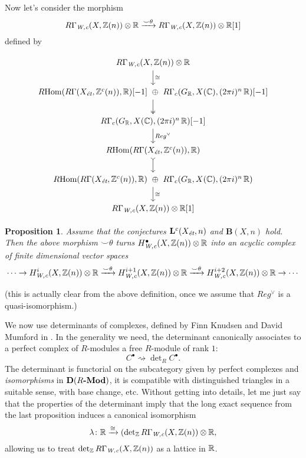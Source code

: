 \documentclass{article}
\theoremstyle{plain}
\newtheorem*{proposition*}{Proposition}
\begin{document}
\pagebreak

Now let's consider the morphism
\[ R\Gamma_\text{\it W,c} (X, \mathbb{Z}(n)) \otimes \mathbb{R}
  \xrightarrow{\smile\theta}
  R\Gamma_\text{\it W,c} (X, \mathbb{Z}(n)) \otimes \mathbb{R} [1] \]
defined by

\[ \begin{tikzcd}
    R\Gamma_\text{\it W,c} (X, \ZZ (n)) \otimes \RR \ar{d}{\isom} \\
    \RHom (R\Gamma (X_\text{\it ét}, \ZZ^c (n)), \RR) [-1] ~\oplus~ R\Gamma_c (G_\RR, X (\CC), (2\pi i)^n\,\RR) [-1] \ar[twoheadrightarrow]{d} \\
    R\Gamma_c (G_\RR, X (\CC), (2\pi i)^n\,\RR) [-1] \ar{d}{Reg^\vee}\\
    \RHom (R\Gamma (X_\text{\it ét}, \ZZ^c (n)), \RR) \ar[rightarrowtail]{d} \\
    \RHom (R\Gamma (X_\text{\it ét}, \ZZ^c (n)), \RR) ~\oplus~ R\Gamma_c (G_\RR, X (\CC), (2\pi i)^n\,\RR) \ar{d}{\isom} \\
    R\Gamma_\text{\it W,c} (X, \ZZ (n)) \otimes \RR [1]
  \end{tikzcd} \]

\begin{proposition*}
  Assume that the conjectures $\mathbf{L}^c (X_\text{\it ét},n)$ and
  $\mathbf{B} (X,n)$ hold. Then the above morphism $\smile\theta$ turns
  $H_\text{\it W,c}^\bullet (X, \mathbb{Z}(n)) \otimes \mathbb{R}$ into an acyclic complex of
  finite dimensional vector spaces
  \[ \cdots \to H_\text{\it W,c}^i (X, \mathbb{Z}(n)) \otimes \mathbb{R} \xrightarrow{\smile\theta}
    H_\text{\it W,c}^{i+1} (X, \mathbb{Z}(n)) \otimes \mathbb{R} \xrightarrow{\smile\theta}
    H_\text{\it W,c}^{i+2} (X, \mathbb{Z}(n)) \otimes \mathbb{R} \to \cdots \]
\end{proposition*}

\noindent (this is actually clear from the above definition, once we assume that
$Reg^\vee$ is a quasi-isomorphism.)

\vspace{1em}

We now use determinants of complexes, defined by Finn Knudsen and David Mumford
in \cite{Knudsen-Mumford-76}. In the generality we need, the determinant
canonically associates to a perfect complex of $R$-modules a free $R$-module of
rank $1$:
$$C^\bullet \rightsquigarrow \det\nolimits_R C^\bullet.$$
The determinant is functorial on the subcategory given by perfect complexes and
\emph{isomorphisms} in $\text{\bf D} (R\text{\bf -Mod})$, it is compatible with
distinguished triangles in a suitable sense, with base change, etc. Without
getting into details, let me just say that the properties of the determinant
imply that the long exact sequence from the last proposition induces a canonical
isomorphism
$$\lambda\colon \mathbb{R} \xrightarrow{\cong} (\det\nolimits_{\mathbb{Z}} R\Gamma_\text{\it W,c} (X,\mathbb{Z}(n)) \otimes \mathbb{R},$$
allowing us to treat $\det\nolimits_{\mathbb{Z}} R\Gamma_\text{\it W,c} (X,\mathbb{Z}(n))$ as
a lattice in $\mathbb{R}$.
\end{document}
